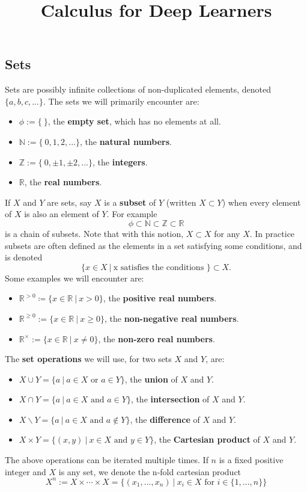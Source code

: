 \documentclass[12pt]{amsart}
\numberwithin{equation}{section}
\newcommand\Rb{{\mathbb R}} %
\newcommand\Zb{{\mathbb Z}} %
\newcommand\Nb{{\mathbb N}} %
\newcommand{\pipe}{\:|\:}
\begin{document}
\title{Calculus for Deep Learners}
\maketitle


\subsection{Sets}\label{S:Sets}
Sets are possibly infinite collections of non-duplicated elements, denoted $\{a,b,c,...\}$.  The sets we will primarily encounter are:
\begin{itemize}
 \item $\phi := \{\:\}$, the \textbf{empty set}, which has no elements at all.
 \item $\Nb := \{\:0,1,2,...\}$, the \textbf{natural numbers}.
 \item $\Zb := \{\:0,\pm 1, \pm 2,...\}$, the \textbf{integers}.
 \item $\Rb$, the \textbf{real numbers}.
\end{itemize}
If $X$ and $Y$ are sets, say $X$ is a \textbf{subset} of $Y$ (written $X\subset Y$) when every element of $X$ is also an element of $Y$.  For example 
$$\phi\subset\Nb\subset\Zb\subset\Rb$$ 
is a chain of subsets.  Note that with this notion, $X\subset X$ for any $X$.
In practice subsets are often defined as the elements in a set satisfying some conditions, and is denoted
$$ \{x\in X \pipe \text{x satisfies the conditions } \} \subset X. $$
Some examples we will encounter are:
\begin{itemize}
 \item $\Rb^{>0} \coloneqq \{ x\in \Rb \pipe x>0 \}$, the \textbf{positive real numbers}.
 \item $\Rb^{\geq 0} := \{ x\in \Rb \pipe x\geq 0 \}$, the \textbf{non-negative real numbers}.
 \item $\Rb^{\times} := \{ x\in \Rb \pipe x\neq 0 \}$, the \textbf{non-zero real numbers}.
\end{itemize}
The \textbf{set operations} we will use, for two sets $X$ and $Y$, are:
\begin{itemize}
 \item $X \cup Y = \{ a \pipe a\in X \text{ or } a\in Y\}$, the \textbf{union} of $X$ and $Y$.
 \item $X \cap Y = \{ a \pipe a\in X \text{ and } a\in Y\}$, the \textbf{intersection} of $X$ and $Y$.
 \item $X \backslash Y = \{ a \pipe a\in X \text{ and } a\notin Y\}$, the \textbf{difference} of $X$ and $Y$.
 \item $X \times Y = \{ (x,y) \pipe x\in X \text{ and } y\in Y\}$, the \textbf{Cartesian product} of $X$ and $Y$.
\end{itemize}
The above operations can be iterated multiple times.  If $n$ is a fixed positive integer and $X$ is any set, we denote the n-fold cartesian product
  $$X^n := X\times \cdots \times X = \{(x_1,\dots,x_n)\pipe x_i\in X \text{ for } i\in \{1,\dots,n\}\}$$
\end{document}
